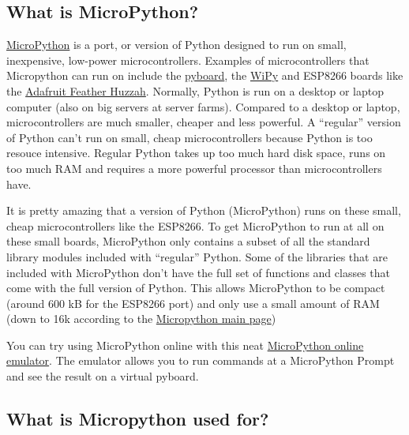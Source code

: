 \documentclass{book}
\begin{document}
    
        \subsection{What is MicroPython?}\label{what-is-micropython}
    




    
        \href{http://micropython.org/}{MicroPython} is a port, or version of
Python designed to run on small, inexpensive, low-power
microcontrollers. Examples of microcontrollers that Micropython can run
on include the \href{https://store.micropython.org/}{pyboard}, the
\href{https://pycom.io/development-boards}{WiPy} and ESP8266 boards like
the
\href{https://learn.adafruit.com/adafruit-feather-huzzah-esp8266}{Adafruit
Feather Huzzah}. Normally, Python is run on a desktop or laptop computer
(also on big servers at server farms). Compared to a desktop or laptop,
microcontrollers are much smaller, cheaper and less powerful. A
``regular'' version of Python can't run on small, cheap microcontrollers
because Python is too resouce intensive. Regular Python takes up too
much hard disk space, runs on too much RAM and requires a more powerful
processor than microcontrollers have.

It is pretty amazing that a version of Python (MicroPython) runs on
these small, cheap microcontrollers like the ESP8266. To get MicroPython
to run at all on these small boards, MicroPython only contains a subset
of all the standard library modules included with ``regular'' Python.
Some of the libraries that are included with MicroPython don't have the
full set of functions and classes that come with the full version of
Python. This allows MicroPython to be compact (around 600 kB for the
ESP8266 port) and only use a small amount of RAM (down to 16k according
to the \href{https://micropython.org/}{Micropython main page})

You can try using MicroPython online with this neat
\href{https://micropython.org/unicorn/}{MicroPython online emulator}.
The emulator allows you to run commands at a MicroPython Prompt and see
the result on a virtual pyboard.
    




    
        \subsection{What is Micropython used
for?}\label{what-is-micropython-used-for}
    
\end{document}
